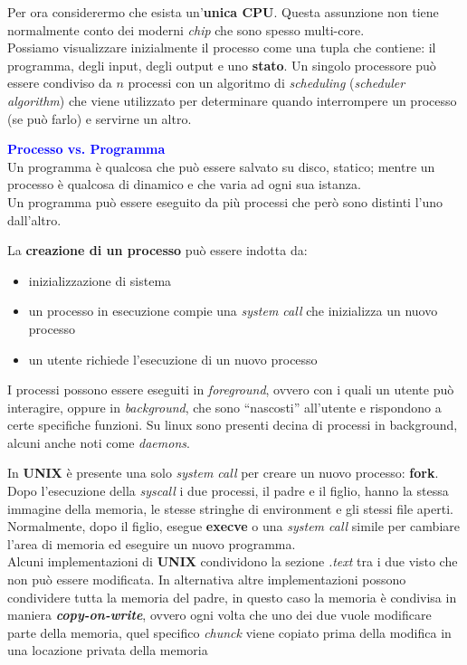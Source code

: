Per ora considerermo che esista un'\textbf{unica CPU}. Questa assunzione non tiene normalmente conto dei moderni \textit{chip} che sono spesso multi-core. \\
Possiamo visualizzare inizialmente il processo come una tupla che contiene: il programma, degli input, degli output e uno \textbf{stato}. Un singolo processore può essere condiviso da $n$ processi con un algoritmo di \textit{scheduling} (\textit{scheduler algorithm}) che viene utilizzato per determinare quando interrompere un processo (se può farlo) e servirne un altro. \\
\begin{boxA}
    \textcolor{blue}{\textbf{Processo vs. Programma}} \\
    Un programma è qualcosa che può essere salvato su disco, statico; mentre un processo è qualcosa di dinamico e che varia ad ogni sua istanza. \\
    Un programma può essere eseguito da più processi che però sono distinti l'uno dall'altro.
\end{boxA}
La \textbf{creazione di un processo} può essere indotta da:
\begin{itemize}[nosep]
    \item inizializzazione di sistema
    \item un processo in esecuzione compie una \textit{system call} che inizializza un nuovo processo
    \item un utente richiede l'esecuzione di un nuovo processo
\end{itemize}
I processi possono essere eseguiti in \textit{foreground}, ovvero con i quali un utente può interagire, oppure in \textit{background}, che sono ``nascosti'' all'utente e rispondono a certe specifiche funzioni. Su linux sono presenti decina di processi in background, alcuni anche noti come \textit{daemons}.
\begin{boxA}
    In \textbf{UNIX} è presente una solo \textit{system call} per creare un nuovo processo: \textbf{fork}. Dopo l'esecuzione della \textit{syscall} i due processi, il padre e il figlio, hanno la stessa immagine della memoria, le stesse stringhe di environment e gli stessi file aperti. Normalmente, dopo il figlio, esegue \textbf{execve} o una \textit{system call} simile per cambiare l'area di memoria ed eseguire un nuovo programma. \\
    Alcuni implementazioni di \textbf{UNIX} condividono la sezione \textit{.text} tra i due visto che non può essere modificata. In alternativa altre implementazioni possono condividere tutta la memoria del padre, in questo caso la memoria è condivisa in maniera \textbf{\textit{copy-on-write}}, ovvero ogni volta che uno dei due vuole modificare parte della memoria, quel specifico \textit{chunck} viene copiato prima della modifica in una locazione privata della memoria
\end{boxA}
